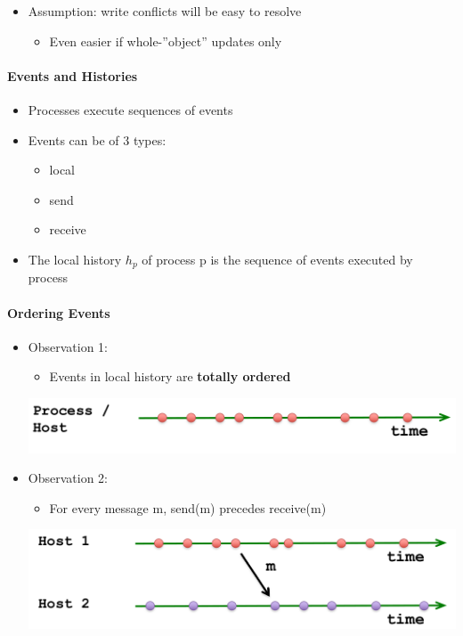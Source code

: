 \begin{itemize}
\item Assumption: write conflicts will be easy to resolve
  \begin{itemize}
  \item Even easier if whole-''object'' updates only
  \end{itemize}
\end{itemize}

\paragraph{Events and Histories}
\begin{itemize}
\item Processes execute sequences of events

\item Events can be of 3 types:
  \begin{itemize}
  \item local
  \item send
  \item receive
  \end{itemize}

\item The local history $h_p$ of process p is the sequence of
  events executed by process
\end{itemize}

\paragraph{Ordering Events}
\begin{itemize}
\item Observation 1:
  \begin{itemize}
  \item Events in local history are \textbf{totally ordered}
  \end{itemize}

  \includegraphics[scale=0.15]{graphics/order-events-obs-1.png}

\item Observation 2:
  \begin{itemize}
  \item For every message m, send(m) precedes receive(m)
  \end{itemize}

  \includegraphics[scale=0.15]{graphics/order-events-obs-2.png}

\end{itemize}

